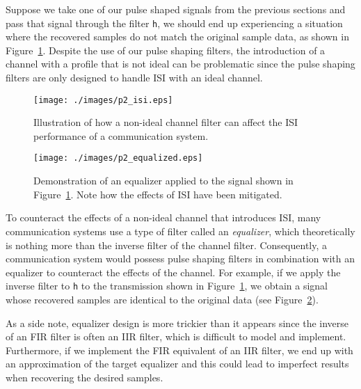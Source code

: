 \documentclass[letterpaper,12pt]{article}
\begin{document}
Suppose we take one of our pulse shaped signals from the previous sections and pass that signal through the filter \texttt{h}, we should end up experiencing a situation where the recovered samples do not match the original sample
data, as shown in Figure~\ref{f:p2_isi}.  Despite the use of our pulse shaping filters, the introduction of a channel with a profile that is not ideal can be problematic since the pulse shaping filters are only designed to handle
ISI with an ideal channel.


\begin{figure}[h]
 \centering
 \texttt{[image: ./images/p2\_isi.eps]}
 \caption{Illustration of how a non-ideal channel filter can affect the ISI performance of a communication system.}\label{f:p2_isi}
\end{figure}
\begin{figure}[h]
 \centering
 \texttt{[image: ./images/p2\_equalized.eps]}
 \caption{Demonstration of an equalizer applied to the signal shown in Figure~\ref{f:p2_isi}.  Note how the effects of ISI have been mitigated.}\label{f:p2_equalized}
\end{figure}

To counteract the effects of a non-ideal channel that introduces ISI, many communication systems use a type of filter called an \textit{equalizer}, which theoretically is nothing more than the inverse filter of the channel filter.
Consequently, a communication system would possess pulse shaping filters in combination with an equalizer to counteract the effects of the channel.  For example, if we apply the inverse filter to \texttt{h} to the transmission shown
in Figure~\ref{f:p2_isi}, we obtain a signal whose recovered samples are identical to the original data (see Figure~\ref{f:p2_equalized}).




As a side note, equalizer design is more trickier than it appears since the inverse of an FIR filter is often an IIR filter, which is difficult
to model and implement.  Furthermore, if we implement the FIR equivalent of an IIR filter, we end up with an approximation of the target equalizer and this could lead to imperfect results when recovering the desired samples.
\end{document}
